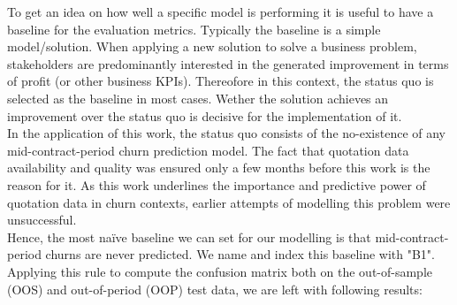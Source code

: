 \documentclass[12pt,titlepage]{article}
\begin{document}
To get an idea on how well a specific model is performing it is useful to have a baseline for the evaluation metrics. Typically the baseline is a simple model/solution. When applying a new solution to solve a business problem, stakeholders are predominantly interested in the generated improvement in terms of profit (or other business KPIs). Thereofore in this context, the status quo is selected as the baseline in most cases. Wether the solution achieves an improvement over the status quo is decisive for the implementation of it. \\
In the application of this work, the status quo consists of the no-existence of any mid-contract-period churn prediction model. The fact that quotation data availability and quality was ensured only a few months before this work is the reason for it. As this work underlines the importance and predictive power of quotation data in churn contexts, earlier attempts of modelling this problem were unsuccessful. \\
Hence, the most naïve baseline we can set for our modelling is that mid-contract-period churns are never predicted. We name and index this baseline with "B1". Applying this rule to compute the confusion matrix both on the out-of-sample (OOS) and out-of-period (OOP) test data, we are left with following results: \\
\noindent
\end{document}
